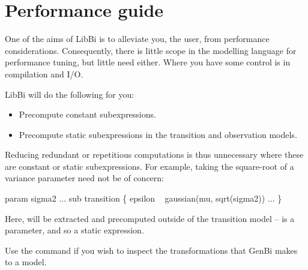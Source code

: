 \section{Performance guide\label{Performance guide}}

One of the aims of LibBi is to alleviate you, the user, from performance
considerations. Consequently, there is little scope in the modelling language
for performance tuning, but little need either. Where you have some control is
in compilation and I/O.

LibBi will do the following for you:
\begin{itemize}
\item Precompute constant subexpressions.
\item Precompute static subexpressions in the transition and observation
  models.
\end{itemize}

Reducing redundant or repetitious computations is thus unnecessary where these
are constant or static subexpressions. For example, taking the square-root of
a variance parameter need not be of concern:
\begin{bicode}
param sigma2
\(\ldots\)
sub transition \{
    epsilon ~ gaussian(mu, sqrt(sigma2))
    \(\ldots\)
\}
\end{bicode}
Here,  will be extracted and precomputed outside of the
transition model --  is a parameter, and so
 a static expression.

Use the  command if you wish to inspect the transformations
that GenBi makes to a model.

